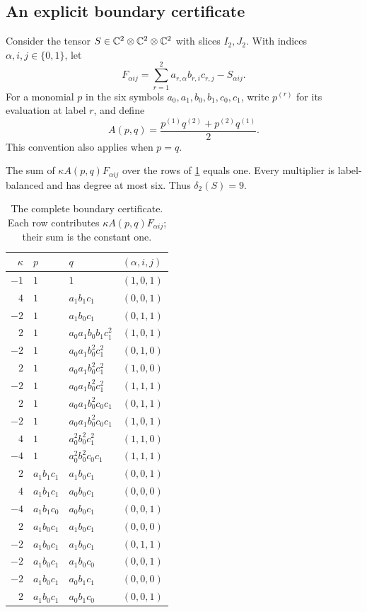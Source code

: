 \subsection{An explicit boundary certificate}

Consider the tensor $S\in\mathbb{C}^2\otimes\mathbb{C}^2\otimes\mathbb{C}^2$ with slices $I_2,J_2$. With indices $\alpha,i,j\in\{0,1\}$, let
\[
 F_{\alpha i j}=\sum_{r=1}^{2}a_{r,\alpha}b_{r,i}c_{r,j}-S_{\alpha i j}.
\]
For a monomial $p$ in the six symbols $a_0,a_1,b_0,b_1,c_0,c_1$, write $p^{(r)}$ for its evaluation at label $r$, and define
\[
                  A(p,q)=\frac{p^{(1)}q^{(2)}+p^{(2)}q^{(1)}}{2}.
\]
This convention also applies when $p=q$.

\begin{lemma}\label{lem:base}
The sum of $\kappa A(p,q)F_{\alpha i j}$ over the rows of \cref{tab:base-certificate} equals one. Every multiplier is label-balanced and has degree at most six. Thus $\delta_2(S)=9$.
\end{lemma}

\begin{table}[htbp]
\centering\small
\begin{tabular}{@{}rlll@{}}
\toprule
$\kappa$ & $p$ & $q$ & $(\alpha,i,j)$ \\
\midrule
$-1$ & $1$ & $1$ & $(1,0,1)$ \\
$4$ & $1$ & $a_1b_1c_1$ & $(0,0,1)$ \\
$-2$ & $1$ & $a_1b_0c_1$ & $(0,1,1)$ \\
$2$ & $1$ & $a_0a_1b_0b_1c_1^2$ & $(1,0,1)$ \\
$-2$ & $1$ & $a_0a_1b_0^2c_1^2$ & $(0,1,0)$ \\
$2$ & $1$ & $a_0a_1b_0^2c_1^2$ & $(1,0,0)$ \\
$-2$ & $1$ & $a_0a_1b_0^2c_1^2$ & $(1,1,1)$ \\
$2$ & $1$ & $a_0a_1b_0^2c_0c_1$ & $(0,1,1)$ \\
$-2$ & $1$ & $a_0a_1b_0^2c_0c_1$ & $(1,0,1)$ \\
$4$ & $1$ & $a_0^2b_0^2c_1^2$ & $(1,1,0)$ \\
$-4$ & $1$ & $a_0^2b_0^2c_0c_1$ & $(1,1,1)$ \\
$2$ & $a_1b_1c_1$ & $a_1b_0c_1$ & $(0,0,1)$ \\
$4$ & $a_1b_1c_1$ & $a_0b_0c_1$ & $(0,0,0)$ \\
$-4$ & $a_1b_1c_0$ & $a_0b_0c_1$ & $(0,0,1)$ \\
$2$ & $a_1b_0c_1$ & $a_1b_0c_1$ & $(0,0,0)$ \\
$-2$ & $a_1b_0c_1$ & $a_1b_0c_1$ & $(0,1,1)$ \\
$-2$ & $a_1b_0c_1$ & $a_1b_0c_0$ & $(0,0,1)$ \\
$-2$ & $a_1b_0c_1$ & $a_0b_1c_1$ & $(0,0,0)$ \\
$2$ & $a_1b_0c_1$ & $a_0b_1c_0$ & $(0,0,1)$ \\
\bottomrule
\end{tabular}
\caption{The complete boundary certificate. Each row contributes $\kappa A(p,q)F_{\alpha i j}$; their sum is the constant one.}
\label{tab:base-certificate}
\end{table}

